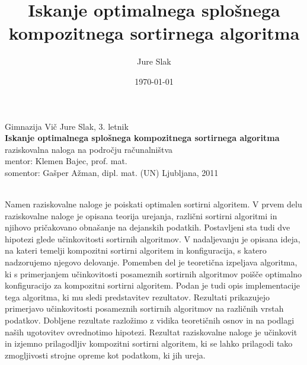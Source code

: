 \documentclass[a4paper,oneside,12pt]{article}
\title{Iskanje optimalnega splošnega kompozitnega sortirnega algoritma}
\author{Jure Slak}
\date{\today}
\begin{document}
\renewcommand{\listfigurename}{Kazalo slik} 
\renewcommand{\listtablename}{Kazalo tabel} 
\renewcommand{\listalgorithmname}{Kazalo algoritmov}

\addto\captionsslovene { %
\renewcommand\bibname{} %
}
\renewcommand\refname{}


\thispagestyle{empty}

\begin{center}{\large
  Gimnazija Vič
  \vfill
  {\Large Jure Slak, 3. letnik}\\[20mm]
  {\bf \huge Iskanje optimalnega splošnega kompozitnega sortirnega algoritma}\\[10mm]
  raziskovalna naloga na področju računalništva\\[1cm]
  mentor: Klemen Bajec, prof. mat. \\[2mm]
  somentor: Gašper Ažman, dipl. mat. (UN)}
  \vfill
  \vfill
  {\large Ljubljana, 2011}
\end{center}
\pagebreak

\thispagestyle{empty}
\\[5mm]
Namen raziskovalne naloge je poiskati optimalen sortirni algoritem.  V prvem delu
raziskovalne naloge je opisana teorija urejanja, različni sortirni algoritmi in njihovo
pričakovano obnašanje na dejanskih podatkih. Postavljeni sta tudi dve hipotezi glede
učinkovitosti sortirnih algoritmov.  V nadaljevanju je opisana ideja, na kateri temelji
kompozitni sortirni algoritem in konfiguracija, s katero nadzorujemo njegovo delovanje.
Pomemben del je teoretična izpeljava algoritma, ki s primerjanjem učinkovitosti posameznih
sortirnih algoritmov poišče optimalno konfiguracijo za kompozitni sortirni algoritem.
Podan je tudi opis implementacije tega algoritma, ki mu sledi predstavitev rezultatov.
Rezultati prikazujejo primerjavo učinkovitosti posameznih sortirnih algoritmov na
različnih vrstah podatkov.  Dobljene rezultate razložimo z vidika teoretičnih osnov in na
podlagi naših ugotovitev ovrednotimo hipotezi. Rezultat raziskovalne naloge je učinkovit
in izjemno prilagodljiv kompozitni sortirni algoritem, ki se lahko prilagodi tako
zmogljivosti strojne opreme kot podatkom, ki jih ureja.

\vfill
\end{document}
